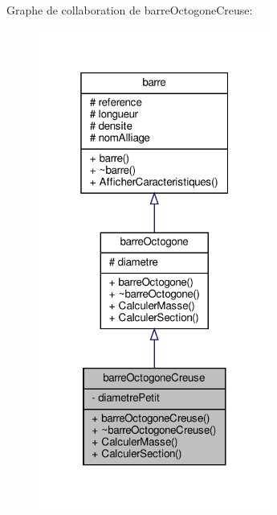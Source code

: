 Graphe de collaboration de barre\+Octogone\+Creuse\+:
\nopagebreak
\begin{figure}[H]
\begin{center}
\leavevmode
\includegraphics[width=217pt]{classbarre_octogone_creuse__coll__graph}
\end{center}
\end{figure}
